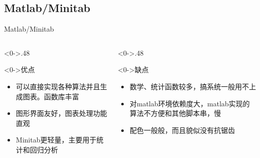 \documentclass[utf8,dvipsnames,aspectratio=169]{beamer}
\newcommand\mk[1]{{\color{RoyalBlue} #1}}
\begin{document}
\subsection{Matlab/Minitab}
\begin{frame}{Matlab/Minitab}
	\begin{columns}
	\begin{column}<0->{.48\textwidth}
		\begin{exampleblock}<0->{\centering 优点}
			\vspace{2em}
			\begin{itemize}
				\item<0-> 可以直接实现各种算法并且生成图表。函数库丰富
				\item<0-> 图形界面友好，图表处理功能直观
				\item<0-> \mk{Minitab}更轻量，主要用于统计和回归分析
			\end{itemize}
			\vspace{2em}
		\end{exampleblock}
	\end{column}
	\begin{column}<0->{.48\textwidth}
		\begin{alertblock}<0->{\centering 缺点}
			\vspace{2em}
			\begin{itemize}
				\item<0-> 数学、统计函数较多，搞系统一般用不上
				\item<0-> 对matlab环境依赖度大，matlab实现的算法不方便和其他脚本串，慢
				\item<0-> 配色一般般，而且貌似没有抗锯齿
			\end{itemize}
			\vspace{2em}
		\end{alertblock}
	\end{column}
	\end{columns}
\end{frame}
\end{document}
